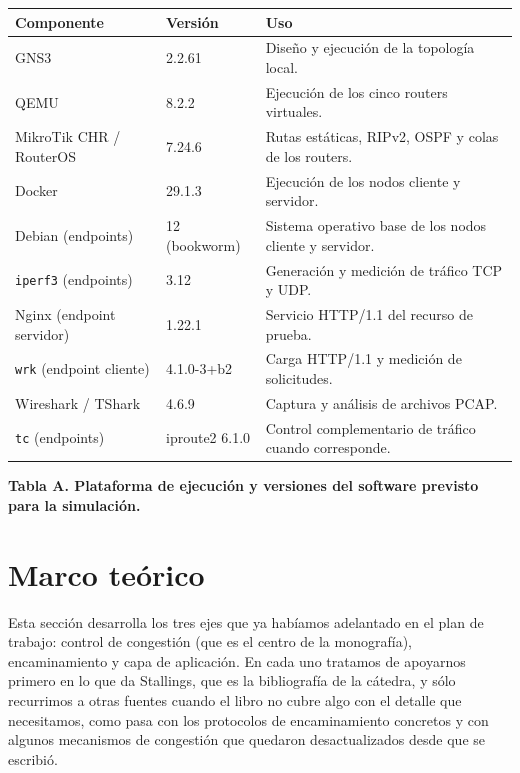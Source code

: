 \documentclass[11pt,a4paper]{article}
\newcommand{\figcaption}[1]{\par\noindent\footnotesize\textbf{#1}\par\vspace{0.4cm}}
\begin{document}
\needspace{1cm}
\begin{center}
\begin{minipage}{0.96\linewidth}
\centering
\small
\begin{tabular}{@{}p{4.1cm}p{4.2cm}p{4.8cm}@{}}
\toprule
\textbf{Componente} & \textbf{Versi\'on} & \textbf{Uso} \\
\midrule
GNS3 & 2.2.61 & Dise\~no y ejecuci\'on de la topolog\'ia local. \\
\midrule
QEMU & 8.2.2 & Ejecuci\'on de los cinco routers virtuales. \\
\midrule
MikroTik CHR / RouterOS & 7.24.6 & Rutas est\'aticas, RIPv2, OSPF y colas de los routers. \\
\midrule
Docker & 29.1.3 & Ejecuci\'on de los nodos cliente y servidor. \\
\midrule
Debian (endpoints) & 12 (bookworm) & Sistema operativo base de los nodos cliente y servidor. \\
\midrule
\texttt{iperf3} (endpoints) & 3.12 & Generaci\'on y medici\'on de tr\'afico TCP y UDP. \\
\midrule
Nginx (endpoint servidor) & 1.22.1 & Servicio HTTP/1.1 del recurso de prueba. \\
\midrule
\texttt{wrk} (endpoint cliente) & 4.1.0-3+b2 & Carga HTTP/1.1 y medici\'on de solicitudes. \\
\midrule
Wireshark / TShark & 4.6.9 & Captura y an\'alisis de archivos PCAP. \\
\midrule
\texttt{tc} (endpoints) & iproute2 6.1.0 & Control complementario de tr\'afico cuando corresponde. \\
\bottomrule
\end{tabular}
\par\vspace{0.1cm}
\figcaption{Tabla A. Plataforma de ejecuci\'on y versiones del software previsto para la simulaci\'on.}
\end{minipage}
\end{center}

\clearpage
\section{Marco te\'orico}

Esta secci\'on desarrolla los tres ejes que ya hab\'iamos adelantado en el plan de trabajo: control de congesti\'on (que es el centro de la monograf\'ia), encaminamiento y capa de aplicaci\'on. En cada uno tratamos de apoyarnos primero en lo que da Stallings, que es la bibliograf\'ia de la c\'atedra, y s\'olo recurrimos a otras fuentes cuando el libro no cubre algo con el detalle que necesitamos, como pasa con los protocolos de encaminamiento concretos y con algunos mecanismos de congesti\'on que quedaron desactualizados desde que se escribi\'o.
\end{document}
